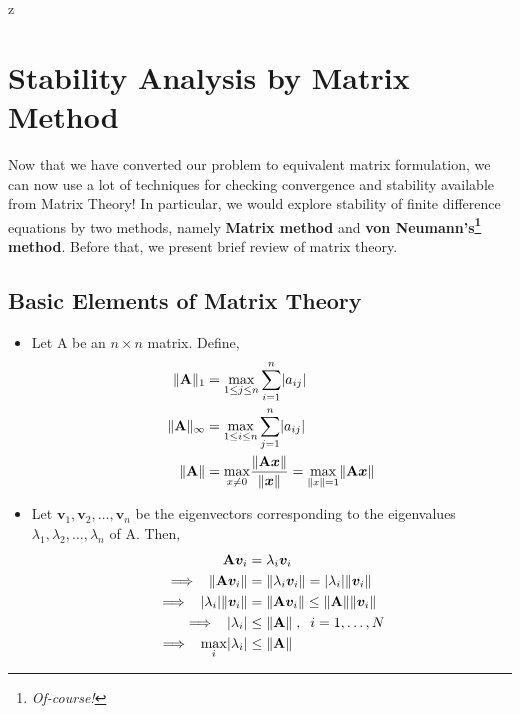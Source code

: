 z\documentclass[a4paper,12pt,twoside]{book}
\newcommand{\nll}[0]{\newline\newline}
\DeclarePairedDelimiter\abs{\lvert}{\rvert}
\newcommand{\vect}[1]{\bm{#1}}
\newcommand{\mat}[1]{\bm{\mathrm{#1}}}
\newcommand{\norm}[1]{\Vert #1 \Vert}
\begin{document}
\section{Stability Analysis by Matrix Method}
Now that we have converted our problem to equivalent matrix formulation, we can now use a lot of techniques for checking convergence and stability available from Matrix Theory! 
\nll
In particular, we would explore stability of finite difference equations by two methods, namely \textbf{Matrix method} and \textbf{von Neumann's\footnote{\textit{Of-course!}} method}.
\nll
Before that, we present brief review of matrix theory.
\subsection{Basic Elements of Matrix Theory}
\begin{itemize}
    \item {Let $\mat{A}$ be an $n\times n$ matrix. Define,
    \begin{equation}
        \begin{split}
            \norm{\mat{A}}_1 &= \underset{1\le j \le n}{\max} \sum_{i=1}^n \abs{a_{ij}}\\ 
            \norm{\mat{A}}_\infty &= \underset{1\le i \le n}{\max} \sum_{j=1}^n \abs{a_{ij}}\\
            \norm{\mat{A}} &= \underset{x\neq 0}{\max} \frac{\norm{\mat{A}\vect{x}}}{\norm{\vect{x}}} = \underset{\norm{x} = 1}{\max} \norm{\mat{A}\vect{x}}
        \end{split}
    \end{equation}
    }
    \item{Let $\vect{v}_1,\vect{v}_2,\dots,\vect{v}_n$ be the eigenvectors corresponding to the eigenvalues $\lambda_1,\lambda_2,\dots,\lambda_n$ of $\mat{A}$. Then,
    \begin{equation}
        \begin{split}
            \mat{A}\vect{v}_i &= \lambda_i \vect{v}_i \\
            \implies\;\;  \norm{\mat{A}\vect{v}_i} &= \norm{\lambda_i \vect{v}_i} = \abs{\lambda_i} \norm{\vect{v}_i}\\
            \implies\;\;\abs{\lambda_i} \norm{\vect{v}_i} &= \norm{\mat{A}\vect{v}_i} \le \norm{\mat{A}}\norm{\vect{v}_i}\\
            \implies\;\; \abs{\lambda_i} &\le \norm{\mat{A}}\;,\;\;i=1,\dots,N\\
            \implies\;\; \underset{i}{\max} \abs{\lambda_i} &\le \norm{\mat{A}}\\

\end{split}
\end{equation}}
\end{itemize}
\end{document}
